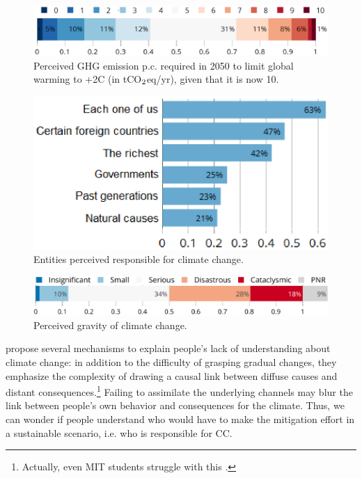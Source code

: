 \documentclass[english,5p,authoryear]{elsarticle}
\begin{document}
\begin{figure}[t]
\centering
\includegraphics[width=\columnwidth]{Images_EPS/CC_target_emission_nolegend.eps}
\caption{Perceived GHG emission p.c. required in 2050 to limit global warming to +2\textdegree{}C (in tCO$_\textnormal{2}$eq/yr), given that it is now 10.}
\label{fig:target_emission}
\end{figure}

%


\begin{figure}[!htbp]
\centering
\includegraphics[width=0.75\columnwidth]{Images_EPS/CC_responsiblec.eps}
\caption{Entities perceived responsible for climate change.}
\label{fig:responsible}
\end{figure}

\begin{figure}[t]
\centering
\includegraphics[width=\columnwidth]{Images_EPS/CC_effects_nolegend.eps}
\caption{Perceived gravity of climate change.}
\label{fig:gravity}
\end{figure}

\citet{millner_beliefs_2016} propose several mechanisms to explain people's lack of understanding about climate change: in addition to the difficulty of grasping gradual changes, they emphasize the complexity of drawing a causal link between diffuse causes and distant consequences.\footnote{Actually, even MIT students struggle with this \citep{sterman_risk_2008}.} Failing to assimilate the underlying channels may blur the link between people's own behavior and consequences for the climate. Thus, we can wonder if people understand who would have to make the mitigation effort in a sustainable scenario, i.e. who is responsible for CC.
\end{document}
